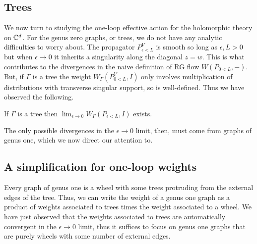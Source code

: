 \documentclass[10pt]{amsart}
\begin{document}
\subsection{Trees}

We now turn to studying the one-loop effective action for the holomorphic theory on $\mathbb C^d$. 
For the genus zero graphs, or trees, we do not have any analytic difficulties to worry about. 
The propagator $P_{\epsilon<L}^V$ is smooth so long as $\epsilon,L > 0$ but when $\epsilon \to 0$ it inherits a singularity along the diagonal $z = w$.
This is what contributes to the divergences in the naive definition of RG flow $W(P_{0<L}, -)$.
But, if $\Gamma$ is a tree the weight $W_\Gamma(P_{0<L}^V, I)$ only involves multiplication of distributions with transverse singular support, so is well-defined.
Thus we have observed the following.

\begin{lem} 
If $\Gamma$ is a tree then $\lim_{\epsilon \to 0} W_{\Gamma}(P_{\epsilon < L}, I)$ exists.
\end{lem}

The only possible divergences in the $\epsilon \to 0$ limit, then, must come from graphs of genus one, which we now direct our attention to.

\subsection{A simplification for one-loop weights}

Every graph of genus one is a wheel with some trees protruding from the external edges of the tree.
Thus, we can write the weight of a genus one graph as a product of weights associated to trees times the weight associated to a wheel.
We have just observed that the weights associated to trees are automatically convergent in the $\epsilon \to 0$ limit, thus it suffices to focus on genus one graphs that are purely wheels with some number of external edges.
\end{document}
